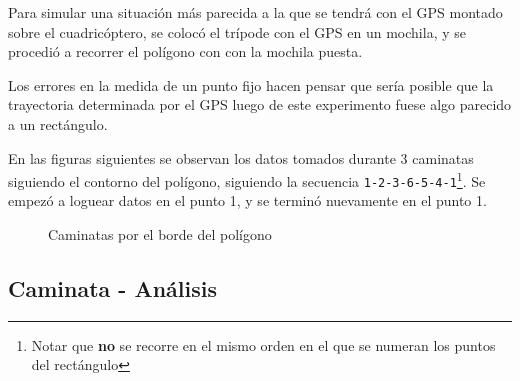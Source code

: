 \documentclass[main]{subfiles}
\begin{document}
Para simular una situación más parecida a la que se tendrá con el GPS montado sobre el cuadricóptero, se colocó el trípode con el GPS en un mochila, y se procedió a recorrer el polígono con con la mochila puesta.

Los errores en la medida de un punto fijo hacen pensar que sería posible que la trayectoria determinada por el GPS luego de este experimento fuese algo parecido a un rectángulo.

En las figuras siguientes se observan los datos tomados durante 3 caminatas siguiendo el contorno del polígono, siguiendo la secuencia \verb+1-2-3-6-5-4-1+\footnote{Notar que \textbf{no} se recorre en el mismo orden en el que se numeran los puntos del rectángulo}. Se empezó a loguear datos en el punto 1, y se terminó nuevamente en el punto 1.

\begin{figure} [h!]
\vspace{-10pt}
  \centering
  \label{fig:caminatas}
\caption{Caminatas por el borde del polígono}
\vspace{-20pt}
\end{figure}

\subsection{Caminata - Análisis}
\label{sec:caminata-analisis}
\end{document}
